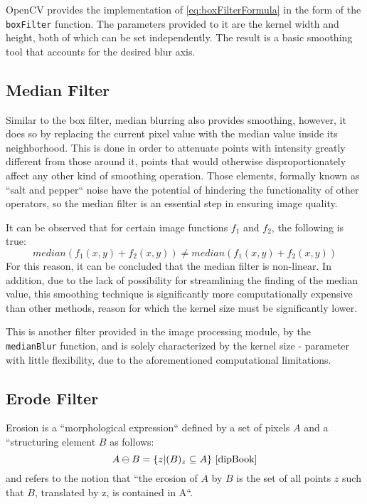 OpenCV provides the implementation of \cref{eq:boxFilterFormula} in the form of the \verb|boxFilter| function.
The parameters provided to it are the kernel width and height, both of which can be set independently. The
result is a basic smoothing tool that accounts for the desired blur axis.

\subsection{Median Filter}

Similar to the box filter, median blurring also provides smoothing, however, it does so by replacing the
current pixel value with the median value inside its neighborhood. This is done in order to attenuate points
with intensity greatly different from those around it, points that would otherwise disproportionately affect
any other kind of smoothing operation. Those elements, formally known as ``salt and pepper`` noise have the
potential of hindering the functionality of other operators, so the median filter is an essential step in
ensuring image quality. \cite{fipBerkley}

It can be observed that for certain image functions \(f_1\) and \(f_2\), the following is true:
\[median(f_1(x, y) + f_2(x, y)) \neq median(f_1(x, y) + f_2(x, y))\]
For this reason, it can be concluded that the median filter is non-linear. In addition, due to the lack of
possibility for streamlining the finding of the median value, this smoothing technique is significantly more
computationally expensive than other methods, reason for which the kernel size must be significantly lower.

This is another filter provided in the image processing module, by the \verb|medianBlur| function, and is
solely characterized by the kernel size - parameter with little flexibility, due to the aforementioned
computational limitations.

\subsection{Erode Filter}

Erosion is a ``morphological expression`` defined by a set of pixels \(A\) and a ``structuring element \(B\)
as follows: \[A \ominus B = \{z | (B)_z \subseteq A\}\text{ \cite{dipBook}}\] and refers to the notion that
``the erosion of \(A\) by \(B\) is the set of all points \(z\) such that \(B\), translated by z, is contained
in A``. \cite{dipBook}

